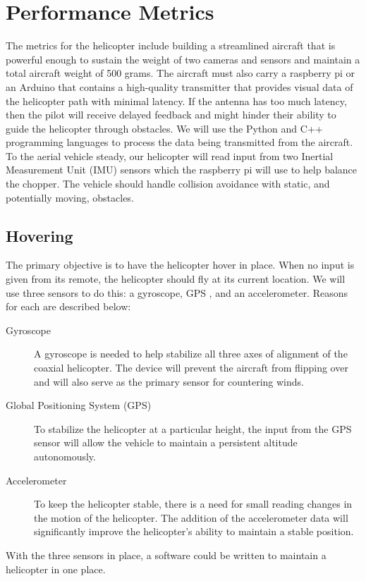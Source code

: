 \documentclass[onecolumn, oneside, letterpaper, draftclsnofoot, 10pt, compsoc]{IEEEtran}
\begin{document}
\section{Performance Metrics}
The metrics for the helicopter include building a streamlined aircraft that is powerful enough to sustain the weight of two cameras and sensors and maintain a total aircraft weight of 500 grams. The aircraft must also carry a raspberry pi or an Arduino that contains a high-quality transmitter that provides visual data of the helicopter path with minimal latency. If the antenna has too much latency, then the pilot will receive delayed feedback and might hinder their ability to guide the helicopter through obstacles. We will use the Python and C++  programming languages to process the data being transmitted from the aircraft. To the aerial vehicle steady, our helicopter will read input from two Inertial Measurement Unit (IMU) sensors which the raspberry pi will use to help balance the chopper. The vehicle should handle collision avoidance with static, and potentially moving, obstacles.

\subsection{Hovering}
The primary objective is to have the helicopter hover in place. When no input is given from its remote, the helicopter should fly at its current location. We will use three sensors to do this: a gyroscope, GPS , and an accelerometer. Reasons for each are described below:
\begin{description}
\item[Gyroscope] A gyroscope is needed to help stabilize all three axes of alignment of the coaxial helicopter. The device will prevent the aircraft from flipping over and will also serve as the primary sensor for countering winds.
\item[Global Positioning System (GPS)] To stabilize the helicopter at a particular height, the input from the GPS sensor will allow the vehicle to maintain a persistent altitude autonomously.

\item[Accelerometer] To keep the helicopter stable, there is a need for small reading changes in the motion of the helicopter. The addition of the accelerometer data will significantly improve the helicopter’s ability to maintain a stable position.
\end{description}
With the three sensors in place, a software could be written to maintain a helicopter in one place.
\end{document}
